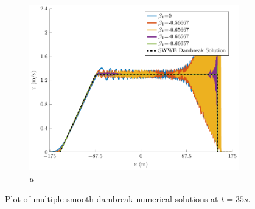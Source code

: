 \documentclass[10pt]{elsarticle}
\begin{document}
\begin{figure}
\begin{subfigure}{0.32\textwidth}
	\includegraphics[width=\textwidth]{./Figures/Simulations/Study/Serre2SWWECloser/u.pdf}
	\caption{$u$}
	\end{subfigure}
	\caption{Plot of multiple smooth dambreak numerical solutions at $t=35s$.}
\end{figure}
\end{document}
